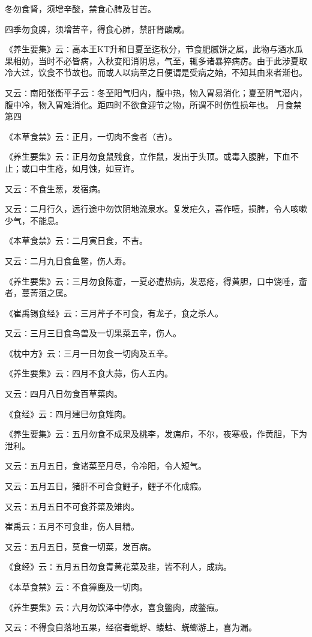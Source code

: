 \documentclass[a4paper,12pt,UTF8,twoside]{ctexbook}
\begin{document}
冬勿食肾，须增辛酸，禁食心脾及甘苦。

四季勿食脾，须增苦辛，得食心肺，禁肝肾酸咸。

《养生要集》云∶高本王KT升和日夏至迄秋分，节食肥腻饼之属，此物与酒水瓜果相妨，当时不必皆病，入秋变阳消阴息，气至，辄多诸暴猝病疠。由于此涉夏取冷大过，饮食不节故也。而或人以病至之日便谓是受病之始，不知其由来者渐也。

又云∶南阳张衡平子云∶冬至阳气归内，腹中热，物入胃易消化；夏至阴气潜内，腹中冷，物入胃难消化。距四时不欲食迎节之物，所谓不时伤性损年也。
月食禁第四

《本草食禁》云∶正月，一切肉不食者（吉）。

《养生要集》云∶正月勿食鼠残食，立作鼠，发出于头顶。或毒入腹脾，下血不止；或口中生疮，如月蚀，如豆许。

又云∶不食生葱，发宿病。

又云∶二月行久，远行途中勿饮阴地流泉水。复发疟久，喜作噎，损脾，令人咳嗽少气，不能息。

《本草食禁》云∶二月寅日食，不吉。

又云∶二月九日食鱼鳖，伤人寿。

《养生要集》云∶三月勿食陈齑，一夏必遭热病，发恶疮，得黄胆，口中饶唾，齑者，蔓菁菹之属。

《崔禹锡食经》云∶三月芹子不可食，有龙子，食之杀人。

又云∶三月三日食鸟兽及一切果菜五辛，伤人。

《枕中方》云∶三月一日勿食一切肉及五辛。

《养生要集》云∶四月不食大蒜，伤人五内。

又云∶四月八日勿食百草菜肉。

《食经》云∶四月建巳勿食雉肉。

《养生要集》云∶五月勿食不成果及桃李，发痈疖，不尔，夜寒极，作黄胆，下为泄利。

又云∶五月五日，食诸菜至月尽，令冷阳，令人短气。

又云∶五月五日，猪肝不可合食鲤子，鲤子不化成瘕。

又云∶五月五日不可食芥菜及雉肉。

崔禹云∶五月不可食韭，伤人目精。

又云∶五月五日，莫食一切菜，发百病。

《食经》云∶五月五日勿食青黄花菜及韭，皆不利人，成病。

《本草食禁》云∶不食獐鹿及一切肉。

《养生要集》云∶六月勿饮泽中停水，喜食鳖肉，成鳖瘕。

又云∶不得食自落地五果，经宿者蚍蜉、蝼蛄、蜣螂游上，喜为漏。
\end{document}

